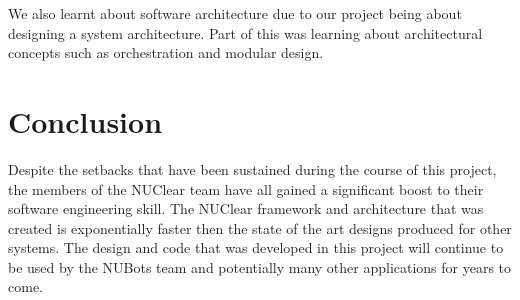 \documentclass[english,12pt]{scrartcl}
\begin{document}
		We also learnt about software architecture due to our project being about designing a system architecture.
		Part of this was learning about architectural concepts such as orchestration and modular design.

\section{Conclusion}
	Despite the setbacks that have been sustained during the course of this project, the members of the NUClear team have all gained a significant boost to their software engineering skill.
	The NUClear framework and architecture that was created is exponentially faster then the state of the art designs produced for other systems.
	The design and code that was developed in this project will continue to be used by the NUBots team and potentially many other applications for years to come.
\end{document}
